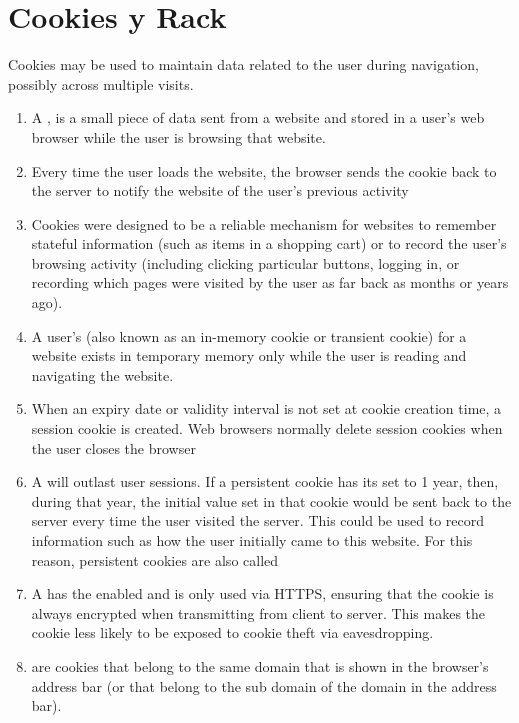 \section{Cookies y Rack}
\label{section:cookies}

Cookies may be used to maintain data related to the user during
navigation, possibly across multiple visits.

\begin{enumerate}
\item 
A ,
is a small piece of data sent from a website and stored in
a user's web browser while the user is browsing that website. 

\item 
Every
time the user loads the website, the browser sends the cookie back
to the server to notify the website of the user's previous activity
\item 
Cookies were designed to be a reliable mechanism for websites to
remember stateful information (such as items in a shopping cart)
or to record the user's browsing activity (including clicking
particular buttons, logging in, or recording which pages were visited
by the user as far back as months or years ago).
\item 
A user's   (also known as an in-memory cookie or
transient cookie) for a website exists in temporary memory only
while the user is reading and navigating the website. 
\item 
When an expiry
date or validity interval is not set at cookie creation time, a
session cookie is created. Web browsers normally delete session
cookies when the user closes the browser
\item 
A  will outlast user sessions. If a persistent
cookie has its  set to 1 year, then, during
that year, the initial value set in that cookie would be sent back
to the server every time the user visited the server. This could
be used to record information such as how the user
initially came to this website. For this reason, persistent cookies
are also called 
\item 
A  has the  enabled and is only used
via HTTPS, ensuring that the cookie is always encrypted when
transmitting from client to server. This makes the cookie less
likely to be exposed to cookie theft via eavesdropping.
\item 
{} are cookies that belong to the same domain that
is shown in the browser's address bar (or that belong to the sub
domain of the domain in the address bar). 


\end{enumerate}
